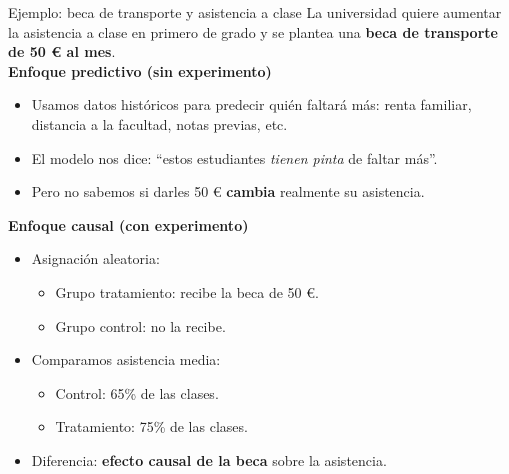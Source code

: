 ﻿\documentclass{beamer}
\begin{document}
\begin{frame}{Ejemplo: beca de transporte y asistencia a clase}
    La universidad quiere aumentar la asistencia a clase en primero de grado
    y se plantea una \textbf{beca de transporte de 50 \euro{} al mes}.\\[2pt]

    \textbf{Enfoque predictivo (sin experimento)}\\[-2pt]
    \begin{itemize}
        \item Usamos datos históricos para predecir quién faltará más:
        renta familiar, distancia a la facultad, notas previas, etc.
        \item El modelo nos dice: ``estos estudiantes \emph{tienen pinta} de faltar más''.
        \item Pero no sabemos si darles 50 \euro{} \textbf{cambia} realmente su asistencia.
    \end{itemize}

    \textbf{Enfoque causal (con experimento)}\\[-2pt]
    \begin{itemize}
        \item Asignación aleatoria:
        \begin{itemize}
            \item Grupo tratamiento: recibe la beca de 50 \euro{}.
            \item Grupo control: no la recibe.
        \end{itemize}
        \item Comparamos asistencia media:
        \begin{itemize}
            \item Control: 65\% de las clases.
            \item Tratamiento: 75\% de las clases.
        \end{itemize}
        \item Diferencia: \textbf{efecto causal de la beca}
        sobre la asistencia.
    \end{itemize}
\end{frame}
\end{document}
